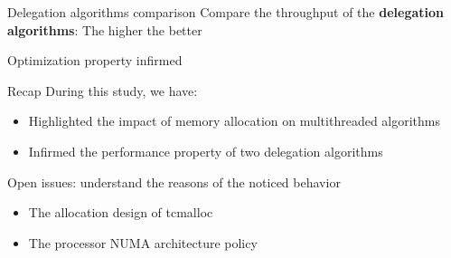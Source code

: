 \documentclass[xcolor=x11names,compress]{beamer}
\renewcommand{\(}{\begin{columns}}
\renewcommand{\)}{\end{columns}}
\newcommand{\<}[1]{\begin{column}{#1}}
\renewcommand{\>}{\end{column}}
\begin{document}
\begin{frame}{Delegation algorithms comparison}
	Compare the throughput of the \textbf{delegation algorithms}: The higher the better

	\begin{figure}[t]
    \begin{center}
	\end{center}
	\end{figure}

	Optimization property infirmed
\end{frame}





\begin{frame}{Recap}
During this study, we have:
	\begin{itemize}
    	\item Highlighted the impact of memory allocation on multithreaded algorithms
        \item Infirmed the performance property of two delegation algorithms
	\end{itemize}

Open issues: understand the reasons of the noticed behavior
	\begin{itemize}
		\item The allocation design of tcmalloc
        \item The processor NUMA architecture policy
	\end{itemize}
\end{frame}
\end{document}
